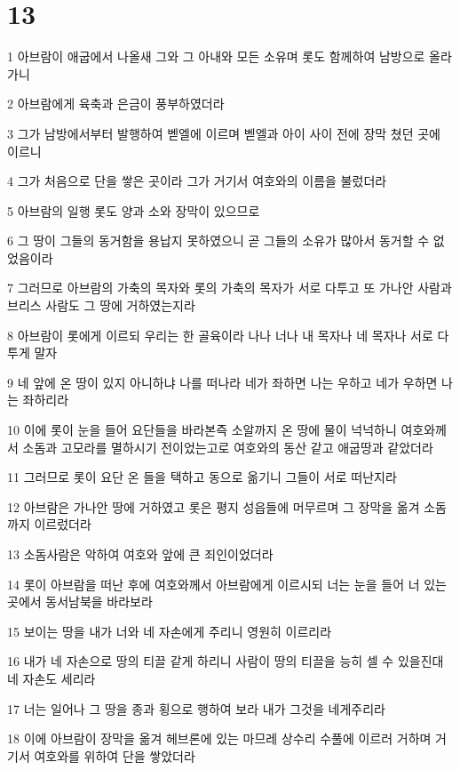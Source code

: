 \chapter{13}

\par 1 아브람이 애굽에서 나올새 그와 그 아내와 모든 소유며 롯도 함께하여 남방으로 올라가니
\par 2 아브람에게 육축과 은금이 풍부하였더라
\par 3 그가 남방에서부터 발행하여 벧엘에 이르며 벧엘과 아이 사이 전에 장막 쳤던 곳에 이르니
\par 4 그가 처음으로 단을 쌓은 곳이라 그가 거기서 여호와의 이름을 불렀더라
\par 5 아브람의 일행 롯도 양과 소와 장막이 있으므로
\par 6 그 땅이 그들의 동거함을 용납지 못하였으니 곧 그들의 소유가 많아서 동거할 수 없었음이라
\par 7 그러므로 아브람의 가축의 목자와 롯의 가축의 목자가 서로 다투고 또 가나안 사람과 브리스 사람도 그 땅에 거하였는지라
\par 8 아브람이 롯에게 이르되 우리는 한 골육이라 나나 너나 내 목자나 네 목자나 서로 다투게 말자
\par 9 네 앞에 온 땅이 있지 아니하냐 나를 떠나라 네가 좌하면 나는 우하고 네가 우하면 나는 좌하리라
\par 10 이에 롯이 눈을 들어 요단들을 바라본즉 소알까지 온 땅에 물이 넉넉하니 여호와께서 소돔과 고모라를 멸하시기 전이었는고로 여호와의 동산 같고 애굽땅과 같았더라
\par 11 그러므로 롯이 요단 온 들을 택하고 동으로 옮기니 그들이 서로 떠난지라
\par 12 아브람은 가나안 땅에 거하였고 롯은 평지 성읍들에 머무르며 그 장막을 옮겨 소돔까지 이르렀더라
\par 13 소돔사람은 악하여 여호와 앞에 큰 죄인이었더라
\par 14 롯이 아브람을 떠난 후에 여호와께서 아브람에게 이르시되 너는 눈을 들어 너 있는 곳에서 동서남북을 바라보라
\par 15 보이는 땅을 내가 너와 네 자손에게 주리니 영원히 이르리라
\par 16 내가 네 자손으로 땅의 티끌 같게 하리니 사람이 땅의 티끌을 능히 셀 수 있을진대 네 자손도 세리라
\par 17 너는 일어나 그 땅을 종과 횡으로 행하여 보라 내가 그것을 네게주리라
\par 18 이에 아브람이 장막을 옮겨 헤브론에 있는 마므레 상수리 수풀에 이르러 거하며 거기서 여호와를 위하여 단을 쌓았더라

